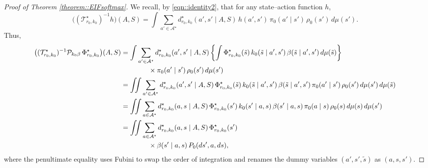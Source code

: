 \documentclass[11pt]{article}
\theoremstyle{plain}
\begin{document}
\begin{proof}[Proof of Theorem \ref{theorem::EIFsoftmax}]
We recall, by \eqref{eqn::identity2}, that for any state–action function \(h\),
\[
\big((\mathcal{T}_{r_0,k_0}^\star)^{-1} h\big)(A,S)
= \int \sum_{a' \in \mathcal{A}^\star} d_{r_0,k_0}^{\star}(a',s'\mid A,S)\,h(a',s')\,
\pi_0(a'\mid s')\,\rho_0(s')\,d\mu(s').
\]
Thus,
\begin{align*}
\big((\mathcal{T}_{r_0,k_0}^\star)^{-1}\mathcal{P}_{k_0\beta} \,\Phi_{r_0,k_0}^\star\big)(A,S)
&= \int \sum_{a' \in \mathcal{A}^\star} d_{r_0,k_0}^{\star}(a',s'\mid A,S)
\left\{\int \Phi_{r_0,k_0}^\star(\tilde s)\,k_0(\tilde s\mid a',s')\,\beta(\tilde s\mid a',s')\,d\mu(\tilde s)\right\}
\notag\\
&\qquad\qquad \times \pi_0(a'\mid s')\,\rho_0(s')\,d\mu(s')\\
&= \iint \sum_{a' \in \mathcal{A}^\star} d_{r_0,k_0}^{\star}(a',s'\mid A,S)\,
 \Phi_{r_0,k_0}^\star(\tilde s)\,k_0(\tilde s\mid a',s')\,\beta(\tilde s\mid a',s')\,
 \pi_0(a'\mid s')\,\rho_0(s')\,d\mu(s')\,d\mu(\tilde s) \\
&= \iint \sum_{a \in \mathcal{A}^\star} d_{r_0,k_0}^{\star}(a,s\mid A,S)\,
 \Phi_{r_0,k_0}^\star(s')\,k_0(s'\mid a,s)\,\beta(s'\mid a,s)\,
 \pi_0(a\mid s)\,\rho_0(s)\,d\mu(s)\,d\mu(s') \\
&= \iint \sum_{a \in \mathcal{A}^\star} d_{r_0,k_0}^{\star}(a,s\mid A,S)\,
 \Phi_{r_0,k_0}^\star(s') \notag\\
&\qquad\qquad \times
 \beta(s'\mid a,s)\,P_0(ds',a,ds),
\end{align*}
where the penultimate equality uses Fubini to swap the order of integration and renames the dummy variables \((a',s',\tilde s)\) as \((a,s,s')\).


\end{proof}
\end{document}
